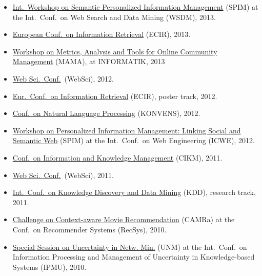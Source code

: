 \documentclass[line,margin]{res}
\begin{document}
\begin{resume}
\begin{itemize}
\item \href{http://spim-workshop.org/}{Int.\ Workshop on Semantic
  Personalized Information Management} (SPIM) at the Int.\ Conf.\ on Web
  Search and Data Mining (WSDM), 2013.  
\item \href{http://ecir2013.org/}{European Conf.\ on Information
  Retrieval} (ECIR), 2013.  
\item \href{http://mama.west.uni-koblenz.de/}{Workshop on Metrics,
  Analysis and Tools for Online Community Management} (MAMA), at
  INFORMATIK, 2013
\item \href{http://www.websci12.org/}{Web Sci.\ Conf.}\ (WebSci), 2012. 
\item \href{http://ecir2012.upf.edu/}{Eur.\ Conf.\ on Information
  Retrieval} (ECIR), poster track, 2012.  
\item \href{http://www.oegai.at/konvens2012/}{Conf.\ on Natural Language
  Processing} (KONVENS), 2012. 
\item \href{http://spim-workshop.org/}{Workshop on Personalized
  Information Management: Linking Social and Semantic Web} (SPIM) at the
  Int.\ Conf.\ on Web Engineering (ICWE), 2012. 
\item \href{http://www.cikm2011.org/}{Conf.\ on Information and Knowledge
  Management} (CIKM), 2011.
\item \href{http://www.websci11.org/}{Web Sci.\ Conf.}\ (WebSci), 2011.
\item \href{http://www.sigkdd.org/kdd/2011/}{Int.\ Conf.\ on 
  Knowledge Discovery and Data Mining} (KDD), research track, 2011.
\item \href{http://www.dai-labor.de/camra2010/}{Challenge on
  Context-aware Movie Recommendation} (CAMRa) at the Conf.\ on  
  Recommender Systems (RecSys), 2010.   
\item \href{http://www.dai-labor.de/unm2010/}{Special Session on Uncertainty in Netw. Min.} (UNM) at the
  Int.\ Conf.\ on Information Processing and Management of
  Uncertainty in Knowledge-based Systems (IPMU), 2010. 
\end{itemize}


\end{resume}
\end{document}

